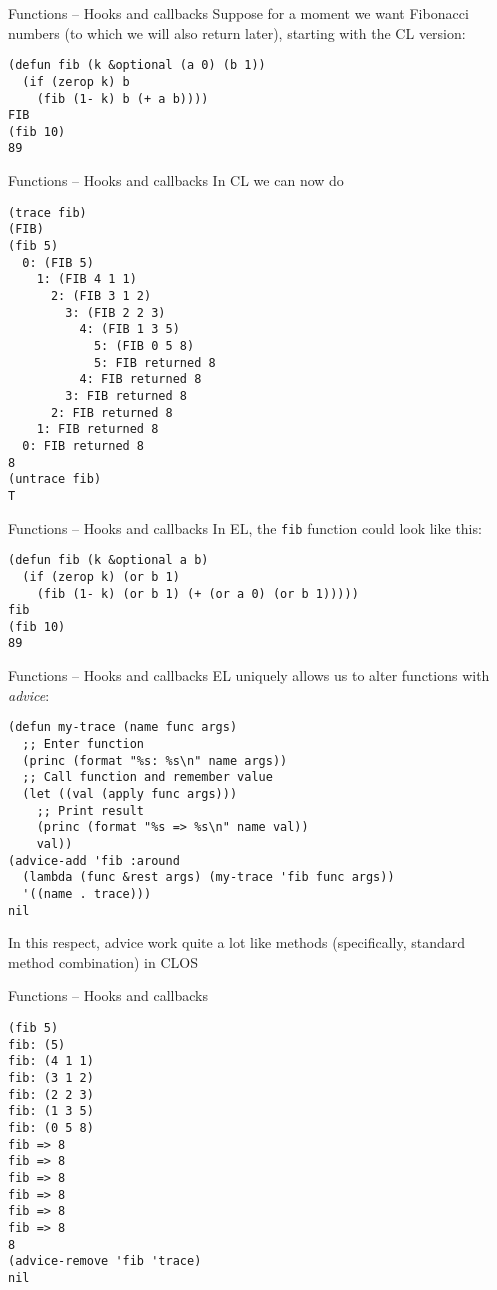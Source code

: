 \documentclass[presentation]{beamer}
\begin{document}
\begin{frame}[fragile]{Functions -- Hooks and callbacks}
  Suppose for a moment we want Fibonacci numbers (to which we will also return later), starting with the CL version:
\begin{verbatim}
(defun fib (k &optional (a 0) (b 1))
  (if (zerop k) b
    (fib (1- k) b (+ a b))))
FIB
(fib 10)
89
\end{verbatim}
\end{frame}

\begin{frame}[fragile]{Functions -- Hooks and callbacks}
  In CL we can now do
\begin{verbatim}
(trace fib)
(FIB)
(fib 5)
  0: (FIB 5)
    1: (FIB 4 1 1)
      2: (FIB 3 1 2)
        3: (FIB 2 2 3)
          4: (FIB 1 3 5)
            5: (FIB 0 5 8)
            5: FIB returned 8
          4: FIB returned 8
        3: FIB returned 8
      2: FIB returned 8
    1: FIB returned 8
  0: FIB returned 8
8
(untrace fib)
T
\end{verbatim}
\end{frame}

\begin{frame}[fragile]{Functions -- Hooks and callbacks}
In EL, the \texttt{fib} function could look like this:
\begin{verbatim}
(defun fib (k &optional a b)
  (if (zerop k) (or b 1)
    (fib (1- k) (or b 1) (+ (or a 0) (or b 1)))))
fib
(fib 10)
89
\end{verbatim}

\end{frame}

\begin{frame}[fragile]{Functions -- Hooks and callbacks}
  EL uniquely allows us to alter functions with \emph{advice}:
\begin{verbatim}
(defun my-trace (name func args)
  ;; Enter function
  (princ (format "%s: %s\n" name args))
  ;; Call function and remember value
  (let ((val (apply func args)))
    ;; Print result
    (princ (format "%s => %s\n" name val))
    val))
(advice-add 'fib :around
  (lambda (func &rest args) (my-trace 'fib func args))
  '((name . trace)))
nil
\end{verbatim}
In this respect, advice work quite a lot like methods (specifically, standard method combination) in CLOS
\end{frame}
\begin{frame}[fragile]{Functions -- Hooks and callbacks}
\begin{verbatim}
(fib 5)
fib: (5)
fib: (4 1 1)
fib: (3 1 2)
fib: (2 2 3)
fib: (1 3 5)
fib: (0 5 8)
fib => 8
fib => 8
fib => 8
fib => 8
fib => 8
fib => 8
8
(advice-remove 'fib 'trace)
nil
\end{verbatim}
\end{frame}
\end{document}
